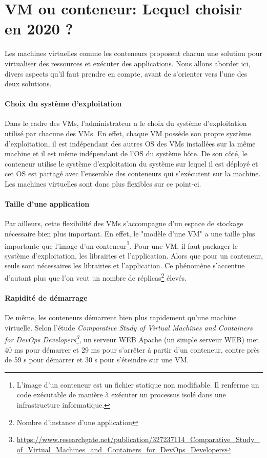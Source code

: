 \documentclass[11pt,fleqn]{book} %
\begin{document}
\section{VM ou conteneur: Lequel choisir en 2020 ? }
Les machines virtuelles comme les conteneurs proposent chacun une solution pour virtualiser des ressources et exécuter des applications. Nous allons aborder ici, divers aspects qu'il faut prendre en compte, avant de s'orienter vers l'une des deux solutions.

\paragraph{Choix du système d'exploitation}
Dans le cadre des VMs, l'administrateur a le choix du système d'exploitation utilisé par chacune des VMs. En effet, chaque VM possède son propre système d'exploitation, il est indépendant des autres OS des VMs installées sur la même machine et il est même indépendant de l'OS du système hôte. De son côté, le conteneur utilise le système d'exploitation du système sur lequel il est déployé et cet OS est partagé avec l'ensemble des conteneurs qui s'exécutent sur la machine. Les machines virtuelles sont donc plus flexibles sur ce point-ci.

\paragraph{Taille d'une application}
Par ailleurs, cette flexibilité des VMs s'accompagne d'un espace de stockage nécessaire bien plus important. En effet, le "modèle d'une VM" a une taille plus importante que l'image d'un conteneur\footnote{L'image d'un conteneur est un fichier statique non modifiable. Il renferme un code exécutable de manière à exécuter un processus isolé dans une infrastructure informatique.}. Pour une VM, il faut packager le système d'exploitation, les librairies et l'application. Alors que pour un conteneur, seuls sont nécessaires les librairies et l'application. Ce phénomène s'accentue d'autant plus que l'on veut un nombre de réplicas\footnote{Nombre d'instance d'une application} élevés.

\paragraph{Rapidité de démarrage}
De même, les conteneurs démarrent bien plus rapidement qu'une machine virtuelle.
Selon l'étude \textit{Comparative Study of Virtual Machines and Containers for DevOps Developers\footnote{\url{https://www.researchgate.net/publication/327237114_Comparative_Study_of_Virtual_Machines_and_Containers_for_DevOps_Developers}}}, un serveur WEB Apache (un simple serveur WEB) met 40 ms pour démarrer et 29 ms pour s'arrêter à partir d'un conteneur, contre près de 59 s pour démarrer et 30 s pour s'éteindre sur une VM.
\end{document}
